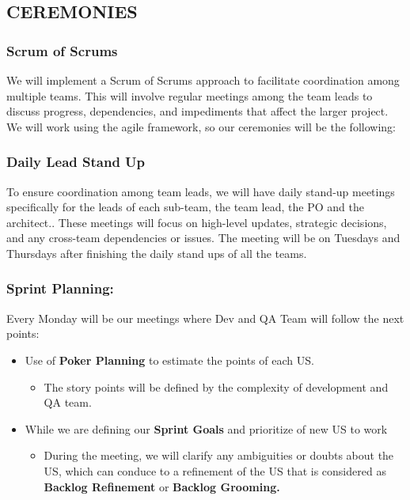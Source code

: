 \newpage

\hypertarget{ceremonies}{
\subsection{CEREMONIES}\label{ceremonies}}

\hypertarget{scrumofscrums}{
\subsubsection{Scrum of Scrums}\label{scrumofscrums}}

We will implement a Scrum of Scrums approach to facilitate coordination
among multiple teams. This will involve regular meetings among the team
leads to discuss progress, dependencies, and impediments that affect the
larger project.\\
We will work using the agile framework, so our ceremonies will be the
following:~

\hypertarget{dailyleadstandup}{
\subsubsection{Daily Lead Stand Up}\label{dailyleadstandup}}

To ensure coordination among team leads, we will have daily stand-up
meetings specifically for the leads of each sub-team, the team lead, the
PO and the architect.. These meetings will focus on high-level updates,
strategic decisions, and any cross-team dependencies or issues. The
meeting will be on Tuesdays and Thursdays after finishing the daily
stand ups of all the teams.

\hypertarget{sprintplanning}{
\subsubsection{Sprint Planning:}\label{sprintplanning}}

Every Monday will be our meetings where Dev and QA Team will follow the
next points:

\begin{itemize}
\tightlist
\item
  Use of \textbf{Poker Planning} to estimate the points of each US.

  \begin{itemize}
  \tightlist
  \item
    The story points will be defined by the complexity of development
    and QA team.
  \end{itemize}
\item
  While we are defining our \textbf{Sprint Goals} and prioritize of new
  US to work

  \begin{itemize}
  \tightlist
  \item
    During the meeting, we will clarify any ambiguities or doubts about
    the US, which can conduce to a refinement of the US that is
    considered as \textbf{Backlog Refinement} or \textbf{Backlog
    Grooming.}
  \end{itemize}
\end{itemize}


